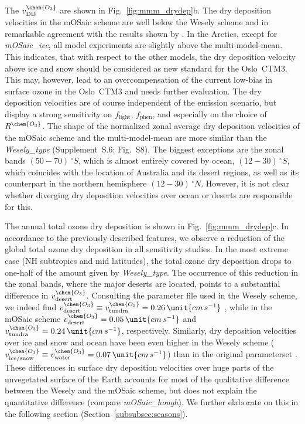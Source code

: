 \documentclass[gmd, manuscript]{copernicus}
\begin{document}
The $v^\chem{O_3}_\text{DD}$ are shown in Fig.~\ref{fig:mmm_drydep}b. The dry deposition velocities in the mOSaic scheme are well below the Wesely scheme and in remarkable agreement with the results shown by \citet{ACP:Hardacre2015}. In the Arctics, except for \emph{mOSaic\_ice}, all model experiments are slightly above the multi-model-mean. This indicates, that with respect to the other models, the \citet{ACP:Helmig2007} dry deposition velocity above ice and snow should be considered as new standard for the Oslo~CTM3. This may, however, lead to an overcompensation of the current low-bias in surface ozone in the Oslo~CTM3 and needs further evaluation. The dry deposition velocities are of course independent of the emission scenario, but display a strong sensitivity on $f_\text{light}$, $f_\text{phen}$, and especially on the choice of $R^\chem{O_3}$. The shape of the normalized zonal average dry deposition velocities of the mOSaic scheme and the multi-model-mean are more similar than the \emph{Wesely\_type} (Supplement~S.6: Fig.~S8). The biggest exceptions are the zonal bands $(50-70)\,\unit{^\circ S}$, which is almost entirely covered by ocean, $(12-30)\,\unit{^\circ S}$, which coincides with the location of Australia and its desert regions, as well as its counterpart in the northern hemisphere $(12-30)\,\unit{^\circ N}$. However, it is not clear whether diverging dry deposition velocities over ocean or deserts are responsible for this.

The annual total ozone dry deposition is shown in Fig.~\ref{fig:mmm_drydep}c. In accordance to the previously described features, we observe a reduction of the global total ozone dry deposition in all sensitivity studies. In the most extreme case (NH subtropics and mid latitudes), the total ozone dry deposition drops to one-half of the amount given by \emph{Wesely\_type}. The occurrence of this reduction in the zonal bands, where the major deserts are located, points to a substantial difference in $v_\text{desert}^\chem{O_3}$. Consulting the parameter file used in the Wesely scheme, we indeed find $v_\text{desert}^\chem{O_3} \equiv v_\text{tundra}^\chem{O_3} = 0.26\,\unit{cm\,s^{-1}}$ \citep{JGR:Hough1991}, while in the mOSaic scheme $v_\text{desert}^\chem{O_3}=0.05\,\unit{cm\,s^{-1}}$ and $v^\chem{O_3}_\text{tundra} = 0.24\,\unit{cm\,s^{-1}}$, respectively. Similarly, dry deposition velocities over ice and snow and ocean have been even higher in the Wesely scheme ($v_\text{ice/snow}^\chem{O_3}\equiv v_\text{water}^\chem{O_3}=0.07\,\unit{cm\,s^{-1}}$) than in the original parameterset \citep[$v_\text{ice/snow}^\chem{O_3}\equiv v_\text{water}^\chem{O_3}=0.05\,\unit{cm\,s^{-1}}$,][]{ACP:Simpson2012}. These differences in surface dry deposition velocities over huge parts of the unvegetated surface of the Earth accounts for most of the qualitative difference between the Wesely and the mOSaic scheme, but does not explain the quantitative difference (compare \emph{mOSaic\_hough}). We further elaborate on this in the following section (Section~\ref{subsubsec:seasons}).
\end{document}
